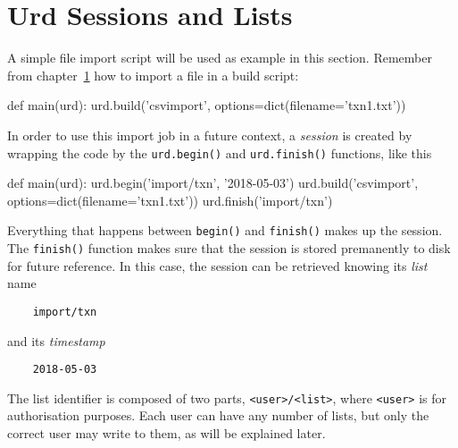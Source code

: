







\section{Urd Sessions and Lists}

A simple file import script will be used as example in this section.
Remember from chapter~\ref{} how to import a file in a build script:
\begin{python}
def main(urd):
    urd.build('csvimport', options=dict(filename='txn1.txt'))
\end{python}
In order to use this import job in a future context,
a \textsl{session} is created by wrapping the code by
the \texttt{urd.begin()} and \texttt{urd.finish()} functions, like this
\begin{python}
def main(urd):
    urd.begin('import/txn', '2018-05-03')
    urd.build('csvimport', options=dict(filename='txn1.txt'))
    urd.finish('import/txn')
\end{python}
Everything that happens between \texttt{begin()} and \texttt{finish()}
makes up the session.  The \texttt{finish()} function makes sure that
the session is stored premanently to disk for future reference.  In
this case, the session can be retrieved knowing its \textsl{list} name
\begin{verbatim}
    import/txn
\end{verbatim}
and its \textsl{timestamp}
\begin{verbatim}
    2018-05-03
\end{verbatim}
The list identifier is composed of two parts, \texttt{<user>/<list>}, where
\texttt{<user>} is for authorisation purposes.  Each user can
have any number of lists, but only the correct user may write to them,
as will be explained later.


